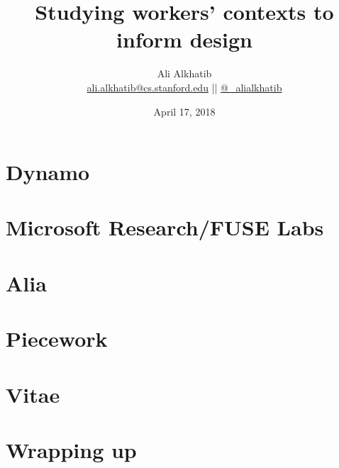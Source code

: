 \documentclass[aspectratio=169,12pt]{beamer} %
\title{Studying workers' contexts to inform design}
\subtitle{\onslide<2->{or\dots\onslide<3->{``using anthropology to guide computer science''}}}
\author{{Ali Alkhatib}\\
\href{mailto:ali.alkhatib@cs.stanford.edu}{ali.alkhatib@cs.stanford.edu} ||
         \href{http://twitter.com/_alialkhatib}{@\_alialkhatib}}
\institute[Stanford]{Google}
\date{April 17, 2018}
\newcommand{\onlyinsubfile}[1]{#1}
\newcommand{\notinsubfile}[1]{}
\begin{document}
\renewcommand{\onlyinsubfile}[1]{}
\renewcommand{\notinsubfile}[1]{#1}

\begin{frame}
\titlepage
\end{frame}







\section{Dynamo}


\section{Microsoft Research/FUSE Labs}


\section{Alia}


\section{Piecework}


\section{Vitae}


\section{Wrapping up}



\end{document}
